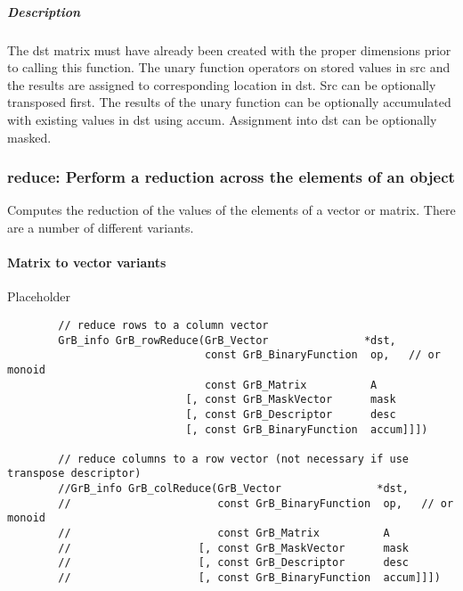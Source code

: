 \subparagraph{Description}

The dst matrix must have already been created with the proper dimensions
prior to calling this function.  The unary function operators on stored values in src and the results are assigned to corresponding location in dst.
Src can be optionally transposed first.  The results of the unary function can be optionally accumulated with existing values in dst using accum.  Assignment into dst can be optionally masked.


\subsubsection{{\sf reduce}: Perform a reduction across the elements of an object}

Computes the reduction of the values of the elements of a vector or matrix.  There are a number of different variants.

\paragraph{Matrix to vector variants}

Placeholder


\begin{verbatim}
        // reduce rows to a column vector
        GrB_info GrB_rowReduce(GrB_Vector               *dst,
                               const GrB_BinaryFunction  op,   // or monoid
                               const GrB_Matrix          A
                            [, const GrB_MaskVector      mask
                            [, const GrB_Descriptor      desc
                            [, const GrB_BinaryFunction  accum]]])
                               
        // reduce columns to a row vector (not necessary if use transpose descriptor)
        //GrB_info GrB_colReduce(GrB_Vector               *dst,
        //                       const GrB_BinaryFunction  op,   // or monoid
        //                       const GrB_Matrix          A
        //                    [, const GrB_MaskVector      mask
        //                    [, const GrB_Descriptor      desc
        //                    [, const GrB_BinaryFunction  accum]]])
\end{verbatim}

